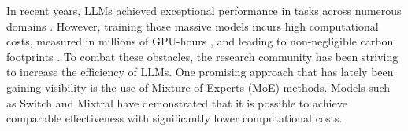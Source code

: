 







In recent years, LLMs achieved exceptional performance in tasks across numerous domains \citep{chowdhery2022palm, yin2023survey, agostinelli2023musiclm}. However, training those massive models incurs high computational costs, measured in millions of GPU-hours \citep{touvron2023llama2,workshop2023bloom}, and leading to non-negligible carbon footprints \citep{faiz2024llmcarbon}. To combat these obstacles, the research community has been striving to increase the efficiency of LLMs. One promising approach that has lately been gaining visibility is the use of Mixture of Experts (MoE) methods.
Models such as Switch \citep{fedus2022switch} and Mixtral \citep{jiang2024mixtral} have demonstrated that it is possible to achieve comparable effectiveness with significantly lower computational costs.


